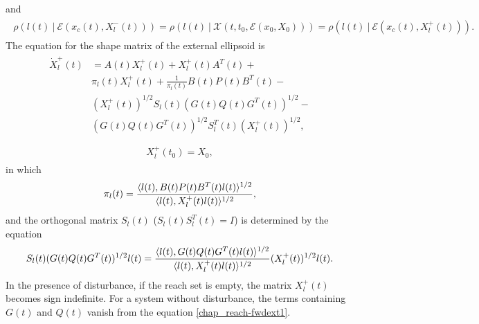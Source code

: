 \documentclass[letterpaper,10pt,english]{sphinxmanual}
\begin{document}
and
\label{chap_reach:equation-fwdtightness}\begin{gather}
\begin{split}\rho(l(t) ~|~ {\mathcal E}(x_c(t), X^-_l(t))) =
\rho(l(t) ~|~ {\mathcal X}(t, t_0, {\mathcal E}(x_0,X_0))) =
\rho(l(t) ~|~ {\mathcal E}(x_c(t), X^+_l(t))) .\end{split}\label{chap_reach-fwdtightness}
\end{gather}
The equation for the shape matrix of the external ellipsoid is
\label{chap_reach:equation-fwdext1}\begin{gather}
\begin{split}\dot{X}^+_l(t) & = A(t)X^+_l(t) + X^+_l(t)A^T(t) +\nonumber \\
&\pi_l(t)X^+_l(t) + \frac{1}{\pi_l(t)}B(t)P(t)B^T(t) -\nonumber \\
& (X_l^{+}(t))^{1/2}S_l(t)(G(t)Q(t)G^T(t))^{1/2} \nonumber -\\
& (G(t)Q(t)G^T(t))^{1/2}S_l^T(t)(X_l^{+}(t))^{1/2}, \\\end{split}\label{chap_reach-fwdext1}
\end{gather}\label{chap_reach:equation-fwdext2}\begin{gather}
\begin{split}X^+_l(t_0) =X_0,\end{split}\label{chap_reach-fwdext2}
\end{gather}
in which
\begin{gather}
\begin{split}\pi_l(t) = \frac{\langle l(t),
B(t)P(t)B^T(t)l(t)\rangle^{1/2}}{\langle l(t), X^+_l(t)l(t)\rangle^{1/2}},\end{split}\notag
\end{gather}
and the orthogonal matrix \(S_l(t)\) (\(S_l(t)S_l^T(t) = I\))
is determined by the equation
\begin{gather}
\begin{split}S_l(t)(G(t)Q(t)G^T(t))^{1/2}l(t) = \frac{\langle l(t),
G(t)Q(t)G^T(t)l(t)\rangle^{1/2}}{\langle l(t),
X_l^+(t)l(t)\rangle^{1/2}}(X_l^{+}(t))^{1/2}l(t).\end{split}\notag
\end{gather}
In the presence of disturbance, if the reach set is empty, the matrix
\(X^+_l(t)\) becomes sign indefinite. For a system without
disturbance, the terms containing \(G(t)\) and \(Q(t)\) vanish
from the equation \eqref{chap_reach-fwdext1}.
\end{document}
